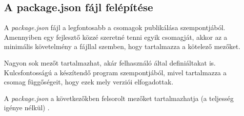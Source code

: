 \begin{flushright}
	\cite{npm-packages}
\end{flushright}

	\subsection{A package.json fájl felépítése}
	
	A \emph{package.json} fájl a legfontosabb a csomagok publikálása szempontjából. Amennyiben egy fejlesztő közzé szeretné tenni egyik csomagját, akkor az a minimális követelmény a fájllal szemben, hogy tartalmazza a kötelező mezőket.
	
	Nagyon sok mezőt tartalmazhat, akár felhasználó által definiáltakat is. Kulcsfontosságú a készítendő program szempontjából, mivel tartalmazza a csomag függőségeit, hogy ezek mely verziói elfogadottak.
	
	A \emph{package.json} a következőkben felsorolt mezőket tartalmazhatja (a teljesség igénye nélkül) \cite{npm-package.json}.
	
